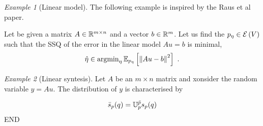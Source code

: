 \documentclass[12pt,a4paper]{amsart}
\theoremstyle{remark}
\newtheorem{example}{Example}
\begin{document}
\begin{example}[Linear model]
  The following example is inspired by the Raus et al paper.

  Let be given a matrix $A \in \mathbb{R}^{m \times n}$ and a vector $b \in \mathbb{R}^m$. Let us find the $p_\eta \in \operatorname{\mathcal E}\left(V\right)$ such that the SSQ of the error in the linear model $Au=b$ is minimal,
  \begin{equation}
    \label{eq:64}
    \hat \eta \in \Argmin_\eta \expectat {p_\eta}{\normof{Au - b}^2} \ .
  \end{equation}
\end{example}

\begin{example}[Linear syntesis]
  Let $A$ be an $m \times n$ matrix and xonsider the random variable $y = Au$. The distribution of $y$ is characterised by
\end{example}

\begin{equation}
  \label{eq:65}
  \bar s_p(q) = {\mathbb U} _ {p} ^ {\bar p} s_p(q)
\end{equation}
END


% 


\end{document}
